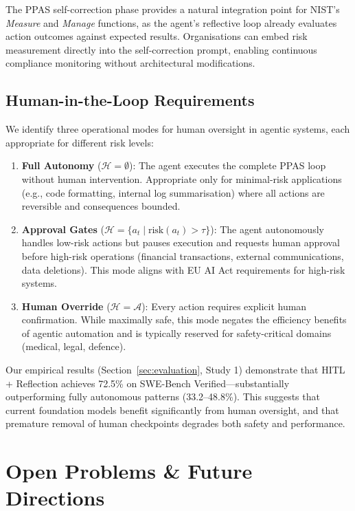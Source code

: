\documentclass[12pt, a4paper]{article}
\begin{document}
The PPAS self-correction phase provides a natural integration point for NIST's \emph{Measure} and \emph{Manage} functions, as the agent's reflective loop already evaluates action outcomes against expected results. Organisations can embed risk measurement directly into the self-correction prompt, enabling continuous compliance monitoring without architectural modifications.

\subsection{Human-in-the-Loop Requirements}
We identify three operational modes for human oversight in agentic systems, each appropriate for different risk levels:

\begin{enumerate}
    \item \textbf{Full Autonomy} ($\mathcal{H} = \emptyset$): The agent executes the complete PPAS loop without human intervention. Appropriate only for minimal-risk applications (e.g., code formatting, internal log summarisation) where all actions are reversible and consequences bounded.
    \item \textbf{Approval Gates} ($\mathcal{H} = \{a_t \mid \text{risk}(a_t) > \tau\}$): The agent autonomously handles low-risk actions but pauses execution and requests human approval before high-risk operations (financial transactions, external communications, data deletions). This mode aligns with EU AI Act requirements for high-risk systems.
    \item \textbf{Human Override} ($\mathcal{H} = \mathcal{A}$): Every action requires explicit human confirmation. While maximally safe, this mode negates the efficiency benefits of agentic automation and is typically reserved for safety-critical domains (medical, legal, defence).
\end{enumerate}

Our empirical results (Section~\ref{sec:evaluation}, Study 1) demonstrate that HITL + Reflection achieves 72.5\% on SWE-Bench Verified---substantially outperforming fully autonomous patterns (33.2--48.8\%). This suggests that current foundation models benefit significantly from human oversight, and that premature removal of human checkpoints degrades both safety and performance.

\section{Open Problems \& Future Directions}\label{sec:future}
\end{document}
